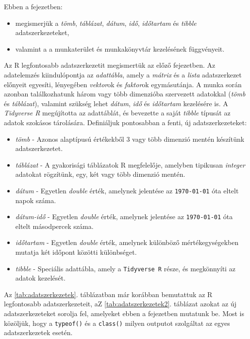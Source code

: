 \documentclass[
]{book}
\makeatletter
\providecommand{\tightlist}{%
  \setlength{\itemsep}{0pt}\setlength{\parskip}{0pt}}
\newenvironment{kframe}{%
\medskip{}
\setlength{\fboxsep}{.8em}
 \def\at@end@of@kframe{}%
 \ifinner\ifhmode%
  \def\at@end@of@kframe{\end{minipage}}%
  \begin{minipage}{\columnwidth}%
 \fi\fi%
 \def\FrameCommand##1{\hskip\@totalleftmargin \hskip-\fboxsep
 \colorbox{shadecolor}{##1}\hskip-\fboxsep
     \hskip-\linewidth \hskip-\@totalleftmargin \hskip\columnwidth}%
 \MakeFramed {\advance\hsize-\width
   \@totalleftmargin\z@ \linewidth\hsize
   \@setminipage}}%
 {\par\unskip\endMakeFramed%
 \at@end@of@kframe}
\newenvironment{rmdblock}[1]
  {
  \begin{itemize}
  \renewcommand{\labelitemi}{
    \raisebox{-.7\height}[0pt][0pt]{
      {\setkeys{Gin}{width=3em,keepaspectratio}\texttt{[image: images/\#1]}}
    }
  }
  \setlength{\fboxsep}{1em}
  \begin{kframe}
  \item
  }
  {
  \end{kframe}
  \end{itemize}
  }
\newenvironment{rmdlevel2}
  {\begin{rmdblock}{level2}}
  {\end{rmdblock}}
\makeatother
\begin{document}
\begin{rmdlevel2}
Ebben a fejezetben:

\begin{itemize}
\tightlist
\item
  megismerjük a \emph{tömb}, \emph{táblázat}, \emph{dátum}, \emph{idő}, \emph{időtartam} és \emph{tibble} adatszerkezeteket,
\item
  valamint a a munkaterület és munkakönyvtár kezelésének függvényeit.
\end{itemize}
\end{rmdlevel2}

Az R legfontosabb adatszerkezetit megismertük az előző fejezetben. Az adatelemzés kiindulópontja az \emph{adattábla}, amely a \emph{mátrix} és a \emph{lista} adatszerkezet előnyeit egyesíti, lényegében \emph{vektor}ok és \emph{faktor}ok egymásutánja. A munka során azonban találkozhatunk három vagy több dimenzióba szervezett adatokkal (\emph{tömb} és \emph{táblázat}), valamint szükség lehet \emph{dátum}, \emph{idő} és \emph{időtartam} kezelésére is. A \emph{Tidyverse R} megújította az adattáblát, és bevezette a saját \emph{tibble} típusát az adatok szokásos tárolására. Definiáljuk pontosabban a fenti, új adatszerkezeteket:

\begin{itemize}
\tightlist
\item
  \emph{tömb} - Azonos alaptípusú értékekből 3 vagy több dimenzió mentén készítünk adatszerkezetet.
\item
  \emph{táblázat} - A gyakorisági táblázatok R megfelelője, amelyben tipikusan \emph{integer} adatokat rögzítünk, egy, két vagy több dimenzió mentén.
\item
  \emph{dátum} - Egyetlen \emph{double} érték, amelynek jelentése az \texttt{1970-01-01} óta eltelt napok száma.
\item
  \emph{dátum-idő} - Egyetlen \emph{double} érték, amelynek jelentése az \texttt{1970-01-01} óta eltelt másodpercek száma.
\item
  \emph{időtartam} - Egyetlen \emph{double} érték, amelynek különböző mértékegységekben mutatja két időpont közötti különbséget.
\item
  \emph{tibble} - Speciális adattábla, amely a \texttt{Tidyverse\ R} része, és megkönnyíti az adatok kezelését.
\end{itemize}

Az \ref{tab:adatszerkezetek}. táblázatban már korábban bemutattuk az R legfontosabb adatszerkezeteit, aZ \ref{tab:adatszerkezetek2}. táblázat azokat az új adatszerkezeteket sorolja fel, amelyeket ebben a fejezetben mutatunk be. Most is közöljük, hogy a \texttt{typeof()} és a \texttt{class()} milyen outputot szolgáltat az egyes adatszerkezetek esetén.
\end{document}
